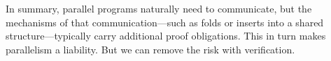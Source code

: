 



In summary, parallel programs naturally need to communicate, but the mechanisms
of that communication---such as folds or inserts into a shared
structure---typically carry additional proof obligations.  This in turn makes
parallelism a liability.  But we can remove the risk with verification.




